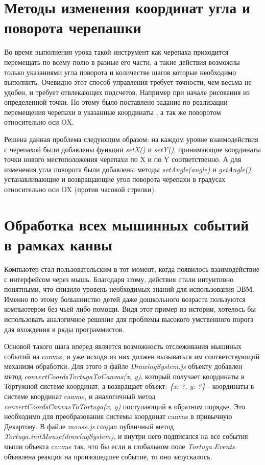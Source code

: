 \section{Методы изменения координат угла и поворота черепашки} \label{sect1_1}
Во время выполнения урока такой инструмент как черепаха приходится перемещать по всему полю в разные его части, а такие действия возможны только указаниями угла поворота и количестве шагов которые необходимо выполнить. Очевидно этот способ управления требует точности, чем весьма не удобен, и требует отвлекающих подсчетов. Например при начале рисования из определенной точки. По этому было поставлено задание по реализации перемещения черепахи в указанные координаты , а так же поворотом относительно оси OX.

Решена данная проблема следующим образом: на каждом уровне взаимодействия с  черепахой были добавлены функции \textit{setX()} и \textit{setY()},  принимающие координаты точки нового местоположения черепахи по X и по Y  соответственно. А для изменения угла поворота были добавлены методы \textit{setAngle(angle)} и \textit{getAngle()}, устанавливающие и возвращающие угол поворота черепахи в градусах относительно оси OX (против часовой стрелки). 



\section{Обработка всех мышинных событий в рамках канвы} \label{sect1_1}

Компьютер стал пользовательским в тот момент, когда появилось взаимодействие с интерфейсом через мышь. Благодаря этому, действия стали интуитивно понятными, что снизило уровень необходимых знаний для использования ЭВМ. Именно по этому большинство детей даже дошкольного возраста пользуются компьютером без чьей либо помощи. Видя этот пример из истории, хотелось бы использовать аналогичное решение для проблемы высокого умственного порога для вхождения в ряды программистов. 

Основой такого шага вперед является возможность отслеживания мышиных событий на canvas, и уже исходя из них должен вызываться им соответствующий механизм обработки. Для этого в файле \textit{DrawingSystem.js}  объекту добавлен  метод \textit{convertCoordsTortugaToCanvas(x, y)}, который получает координаты в Тортужной системе координат, а возвращает объект: \textit{\{x: ?, y: ?\}} - координаты в системе координат canvas, и аналогичный метод \textit{convertCoordsCanvasToTortuga(x, y)}  поступающий в обратном порядке. Это необходимо для  преобразования системы координат canvas  в привычную Декартову. В файле \textit{mouse.js} создал публичный метод \textit{Tortuga.initMouse(drawingSystem)}, и внутри него подписался на все события мыши объекта canvas так, что бы если в глобальном поле \textit{Tortuga.Events} объявлена реакция на произошедшее событие, то оно запускалось. 

